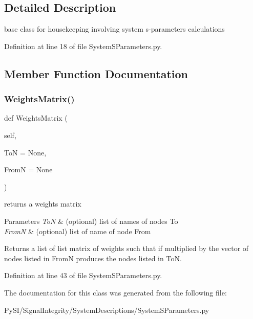 \subsection{Detailed Description}
base class for housekeeping involving system s-\/parameters calculations 

Definition at line 18 of file System\+S\+Parameters.\+py.



\subsection{Member Function Documentation}
\mbox{\label{classSignalIntegrity_1_1SystemDescriptions_1_1SystemSParameters_1_1SystemSParameters_a60ce3b270f6f66dd0e2fb9f64629f8e6}} 
\subsubsection{\texorpdfstring{Weights\+Matrix()}{WeightsMatrix()}}
{\footnotesize\ttfamily def Weights\+Matrix (\begin{DoxyParamCaption}\item[{}]{self,  }\item[{}]{ToN = {\ttfamily None},  }\item[{}]{FromN = {\ttfamily None} }\end{DoxyParamCaption})\hspace{0.3cm}{\ttfamily [protected]}}



returns a weights matrix 


\begin{DoxyParams}{Parameters}
{\em ToN} & (optional) list of names of nodes To \\
\hline
{\em FromN} & (optional) list of name of node From \\
\hline
\end{DoxyParams}
\begin{DoxyReturn}{Returns}
a list of list matrix of weights such that if multiplied by the vector of nodes listed in FromN produces the nodes listed in ToN. 
\end{DoxyReturn}


Definition at line 43 of file System\+S\+Parameters.\+py.



The documentation for this class was generated from the following file\+:\begin{DoxyCompactItemize}
\item 
Py\+S\+I/\+Signal\+Integrity/\+System\+Descriptions/System\+S\+Parameters.\+py\end{DoxyCompactItemize}
